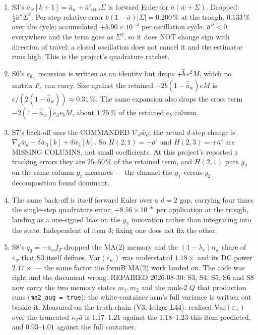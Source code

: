 \documentclass[11pt,a4paper,fontset=none]{ctexart}
\newcommand{\ba}{\bar{a}}
\newcommand{\bw}{\bar{w}}
\begin{document}
\begin{enumerate}
\item S3's $\ba_w[k+1] = \ba_w + \ba'_{\mathrm{true}}\Sigma$ is forward Euler for
$\ba(\bw+\Sigma)$. Dropped: $\tfrac12\ba''\Sigma^{2}$. Per-step relative error
$b(1-\ba)|\Sigma| = 0.200\,\%$ at the trough, $0.133\,\%$ over the cycle;
accumulated $+5.90\times10^{-4}$ per oscillation cycle. $\ba'' < 0$ everywhere
and the term goes as $\Sigma^{2}$, so it does NOT change sign with direction of
travel: a closed oscillation does not cancel it and the estimator runs high.
This is the project's quadrature ratchet.

\item S6's $e_{\ba_w}$ recursion is written as an identity but drops
$+\hat{b}\,e^{2}M$, which no matrix $F_e$ can carry. Size against the retained
$-2\hat{b}(1-\hat{\ba}_w)eM$ is $e/(2(1-\hat{\ba}_w)) \approx 0.31\,\%$. The same
expansion also drops the cross term $-2(1-\hat{\ba}_w)e_{\ba}e_b M$, about
$1.25\,\%$ of the retained $e_b$ column.

\item S7's back-off uses the COMMANDED $\nabla_d\bw_d$; the actual $d$-step
change is $\nabla_d\bw_d - \delta\bw_3[k] + \delta\bw_1[k]$. So
$H(2,1) = -\ba'$ and $H(2,3) = +\ba'$ are MISSING COLUMNS, not small
coefficients. At this project's reported $z$ tracking errors they are
$25$--$50\,\%$ of the retained term, and $H(2,1)$ puts $y_2$ on the same column
$y_1$ measures --- the channel the $y_1$-versus-$y_2$ decomposition found
dominant.

\item The same back-off is itself forward Euler over a $d=2$ gap, carrying four
times the single-step quadrature error: $+8.56\times10^{-6}$ per application at
the trough, landing as a one-signed bias on the $y_2$ innovation rather than
integrating into the state. Independent of item 3; fixing one does not fix the
other.

\item S8's $q_3 = -\ba_w\bar{f}_T$ dropped the MA(2) memory and the
$(1-\lambda_c)n_w$ share of $\varepsilon_w$ that S3 itself defines.
$\mathrm{Var}(\varepsilon_w)$ was understated $1.18\times$ and its DC power
$2.17\times$ --- the same factor the formB MA(2) work landed on. The code was
right and the document wrong. REPAIRED 2026-08-30: S3, S4, S5, S6 and S8 now
carry the two memory states $m_1, m_2$ and the rank-2 $Q$ that production runs
(\texttt{ma2\_aug = true}); the white-container arm's full variance is written
out beside it. Measured on the truth chain (V3, ledger L44): realised
$\mathrm{Var}(\varepsilon_w)$ over the truncated $\kappa_T\ba$ is $1.17$--$1.21$
against the $1.18$--$1.23$ this item predicted, and $0.93$--$1.01$ against the
full container.


\end{enumerate}
\end{document}
